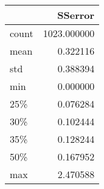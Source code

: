 \begin{tabular}{lr}
\toprule
{} &      SSerror \\
\midrule
count &  1023.000000 \\
mean  &     0.322116 \\
std   &     0.388394 \\
min   &     0.000000 \\
25\%   &     0.076284 \\
30\%   &     0.102444 \\
35\%   &     0.128244 \\
50\%   &     0.167952 \\
max   &     2.470588 \\
\bottomrule
\end{tabular}
